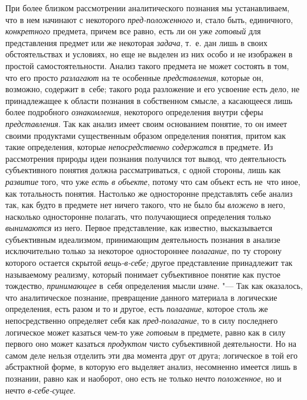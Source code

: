 При более близком рассмотрении аналитического познания мы
устанавливаем, что в нем начинают с некоторого
{\em пред-положенного}
и, стало быть, единичного,
{\em конкретного}
предмета, причем все равно, есть ли он уже
{\em готовый} для
представления предмет или же некоторая
{\em задача}, т.~е. дан
лишь в своих обстоятельствах и условиях, но еще не выделен из них особо и
не изображен в простой самостоятельности. Анализ такого предмета не может
состоять в том, что его просто
{\em разлагают} на те
особенные {\em представления},
которые он, возможно, содержит в~себе; такого рода разложение
и его усвоение есть дело, не принадлежащее к области познания в собственном
смысле, а касающееся лишь более подробного
{\em ознакомления},
некоторого определения внутри сферы
{\em представления}. Так
как анализ имеет своим основанием понятие, то он имеет своими продуктами
существенным образом определения понятия, притом как такие определения,
которые {\em непосредственно
содержатся} в предмете. Из рассмотрения природы идеи
познания получился тот вывод, что деятельность субъективного понятия должна
рассматриваться, с одной стороны, лишь как
{\em развитие} того, что
уже {\em есть в объекте},
потому что сам объект есть не~что иное, как тотальность
понятия. Настолько же односторонне представлять себе анализ так, как будто
в предмете нет ничего такого, что не было бы
{\em вложено} в него,
насколько односторонне полагать, что получающиеся определения
только {\em вынимаются}
из него. Первое представление, как известно, высказывается
субъективным идеализмом, принимающим деятельность познания в анализе
исключительно только за некоторое одностороннее
{\em полагание}, по ту
сторону которого остается скрытой
{\em вещь-в-себе;} другое
представление принадлежит так называемому реализму, который понимает
субъективное понятие как пустое тождество,
{\em принимающее} в~себя
определения мысли {\em извне}. "---
Так как оказалось, что аналитическое познание, превращение
данного материала в логические определения, есть разом и то и другое, есть
{\em полагание}, которое
столь же непосредственно определяет себя как
{\em пред-полагание}, то
в силу последнего логическое может казаться чем-то уже
{\em готовым} в предмете,
равно как в силу первого оно может казаться
{\em продуктом} чисто
субъективной деятельности. Но на самом деле нельзя отделить эти два момента
друг от друга; логическое в той его абстрактной форме, в которую его
выделяет анализ, несомненно имеется лишь в познании, равно как и наоборот,
оно есть не только нечто
{\em положенное}, но и
нечто {\em в-себе-сущее}.

